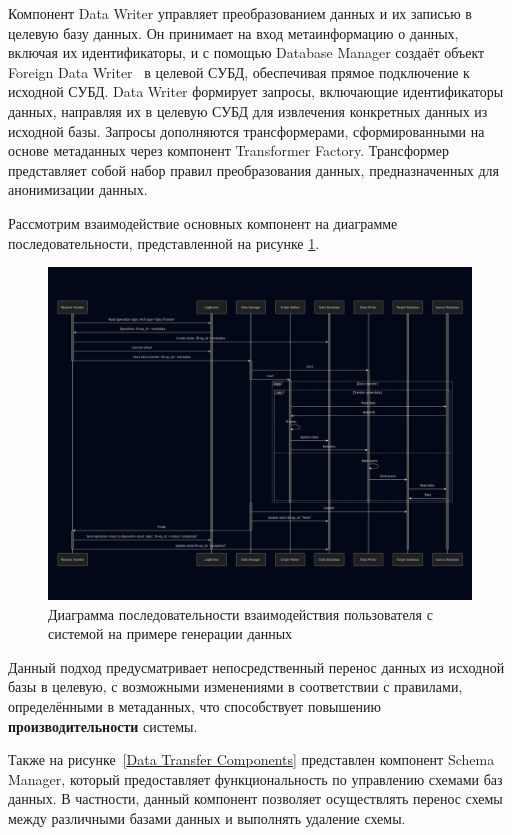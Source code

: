 Компонент Data Writer управляет преобразованием данных и их записью в целевую базу данных. Он принимает на вход метаинформацию о данных, включая их идентификаторы, и с помощью Database Manager создаёт объект Foreign Data Writer~\cite{fdw} в целевой СУБД, обеспечивая прямое подключение к исходной СУБД. Data Writer формирует запросы, включающие идентификаторы данных, направляя их в целевую СУБД для извлечения конкретных данных из исходной базы. Запросы дополняются трансформерами, сформированными на основе метаданных через компонент Transformer Factory. Трансформер представляет собой набор правил преобразования данных, предназначенных для анонимизации данных.

Рассмотрим взаимодействие основных компонент на диаграмме последовательности, представленной на рисунке \ref{Sequence DataTransferComponents}.

\begin{figure}
  \includegraphics[scale=0.2]{./img/mermaid-sequence-DataTransfer.png}
  \caption{Диаграмма последовательности взаимодействия пользователя с системой на примере генерации данных}
  \label{Sequence DataTransferComponents}
\end{figure}

Данный подход предусматривает непосредственный перенос данных из исходной базы в целевую, с возможными изменениями в соответствии с правилами, определёнными в метаданных, что способствует повышению \textbf{производительности} системы.

Также на рисунке~\ref{Data Transfer Components} представлен компонент Schema Manager, который предоставляет функциональность по управлению схемами баз данных. В частности, данный компонент позволяет осуществлять перенос схемы между различными базами данных и выполнять удаление схемы.

